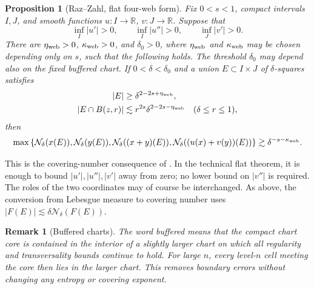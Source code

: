\documentclass[11pt]{article}
\newtheorem{proposition}[theorem]{Proposition}
\newtheorem{remark}[theorem]{Remark}
\begin{document}
\begin{proposition}[Raz--Zahl, flat four-web form]
\label{prop:RZ-flat}
Fix \(0<s<1\), compact intervals \(I,J\), and smooth functions
\(u:I\to\mathbb R\), \(v:J\to\mathbb R\).  Suppose that
\begin{equation}
 \inf_I|u'|>0,\qquad \inf_I|u''|>0,\qquad
 \inf_J|v'|>0.
 \label{eq:flat-regularity}
\end{equation}
There are \(\eta_{\rm web}>0\), \(\kappa_{\rm web}>0\), and
\(\delta_0>0\), where \(\eta_{\rm web}\) and
\(\kappa_{\rm web}\) may be chosen depending only on \(s\), such
that the following holds.  The threshold \(\delta_0\) may depend
also on the fixed buffered chart.  If \(0<\delta<\delta_0\) and a union
\(E\subset I\times J\) of \(\delta\)-squares satisfies
\begin{align}
 |E|&\ge\delta^{2-2s+\eta_{\rm web}},
 \label{eq:RZ-flat-size}\\
 |E\cap B(z,r)|
 &\lesssim r^{2s}\delta^{2-2s-\eta_{\rm web}}
 \quad(\delta\le r\le1),
 \label{eq:RZ-flat-NC}
\end{align}
then
\begin{equation}
 \max\left\{
 \mathcal N_\delta(x(E)),\mathcal N_\delta(y(E)),
 \mathcal N_\delta((x+y)(E)),
 \mathcal N_\delta((u(x)+v(y))(E))
 \right\}
 \gtrsim\delta^{-s-\kappa_{\rm web}}.
 \label{eq:RZ-flat-conclusion}
\end{equation}
\end{proposition}

This is the covering-number consequence of
\cite[Theorem~1.12]{RZ}.  In the technical flat theorem, it is
enough to bound \(|u'|,|u''|,|v'|\) away from zero; no lower bound on
\(|v''|\) is required.  The roles of the two coordinates may of
course be interchanged.  As above, the conversion from Lebesgue
measure to covering number uses
\(|F(E)|\lesssim\delta\mathcal N_\delta(F(E))\).

\begin{remark}[Buffered charts]
The word buffered means that the compact chart core is
contained in the interior of a slightly larger chart on which all
regularity and transversality bounds continue to hold.  For large
\(n\), every level-\(n\) cell meeting the core then lies in the
larger chart.  This removes boundary errors without changing any
entropy or covering exponent.
\end{remark}
\end{document}
